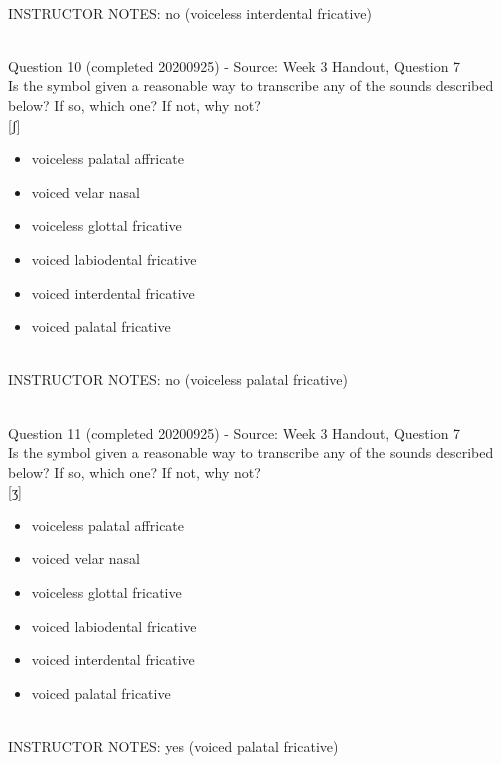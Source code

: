 \documentclass[12pt]{article}
\begin{document}
~\\
INSTRUCTOR NOTES: no (voiceless interdental fricative)


~\\

{\large Question 10} (completed 20200925) - Source: Week 3 Handout, Question 7\\

Is the symbol given a reasonable way to transcribe any of the sounds described below? If so, which one? If not, why not?\\

{[ʃ]}

\begin{itemize} \item voiceless palatal affricate \item voiced velar nasal \item voiceless glottal fricative \item voiced labiodental fricative \item voiced interdental fricative \item voiced palatal fricative \end{itemize}


~\\
INSTRUCTOR NOTES: no (voiceless palatal fricative)


~\\

{\large Question 11} (completed 20200925) - Source: Week 3 Handout, Question 7\\

Is the symbol given a reasonable way to transcribe any of the sounds described below? If so, which one? If not, why not?\\

{[ʒ]}

\begin{itemize} \item voiceless palatal affricate \item voiced velar nasal \item voiceless glottal fricative \item voiced labiodental fricative \item voiced interdental fricative \item voiced palatal fricative \end{itemize}


~\\
INSTRUCTOR NOTES: yes (voiced palatal fricative)


~\\
\end{document}
